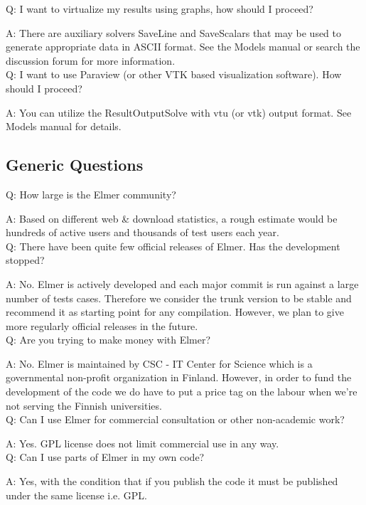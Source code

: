     Q: I want to virtualize my results using graphs, how should I proceed?

    A: There are auxiliary solvers SaveLine and SaveScalars that may be used to generate appropriate data in ASCII format. See the Models manual or search the discussion forum for more information.\\

    Q: I want to use Paraview (or other VTK based visualization software). How should I proceed?

    A: You can utilize the ResultOutputSolve with vtu (or vtk) output format. See Models manual for details.\\

\subsection{Generic Questions}

    Q: How large is the Elmer community?

    A: Based on different web \& download statistics, a rough estimate would be hundreds of active users and thousands of test users each year.\\

    Q: There have been quite few official releases of Elmer. Has the development stopped?

    A: No. Elmer is actively developed and each major commit is run against a large number of tests cases. Therefore we consider the trunk version to be stable and recommend it as starting point for any compilation. However, we plan to give more regularly official releases in the future.\\

    Q: Are you trying to make money with Elmer?

    A: No. Elmer is maintained by CSC - IT Center for Science which is a governmental non-profit organization in Finland. However, in order to fund the development of the code we do have to put a price tag on the labour when we're not serving the Finnish universities.\\

    Q: Can I use Elmer for commercial consultation or other non-academic work?

    A: Yes. GPL license does not limit commercial use in any way.\\

    Q: Can I use parts of Elmer in my own code?

    A: Yes, with the condition that if you publish the code it must be published under the same license i.e. GPL.\\

